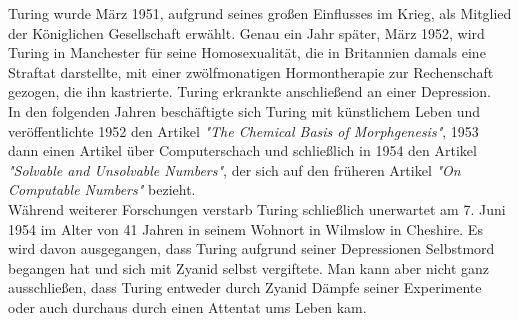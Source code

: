 Turing wurde März 1951, aufgrund seines großen Einflusses im Krieg, als Mitglied der Königlichen Gesellschaft erwählt.
Genau ein Jahr später, März 1952, wird Turing in Manchester für seine Homosexualität, die in Britannien damals eine Straftat darstellte, mit einer zwölfmonatigen Hormontherapie zur Rechenschaft gezogen, die ihn kastrierte. Turing erkrankte anschließend an einer Depression.\\
In den folgenden Jahren beschäftigte sich Turing mit künstlichem Leben und veröffentlichte 1952 den Artikel \textit{"The Chemical Basis of Morphgenesis"}, 1953 dann einen Artikel über Computerschach und schließlich in 1954 den Artikel \textit{"Solvable and Unsolvable Numbers"},  der sich auf den früheren Artikel \textit{"On Computable Numbers"} bezieht.\\
Während weiterer Forschungen verstarb Turing schließlich unerwartet am 7. Juni 1954 im Alter von 41 Jahren in seinem Wohnort in Wilmslow in Cheshire. Es wird davon ausgegangen, dass Turing aufgrund seiner Depressionen Selbstmord begangen hat und sich mit Zyanid selbst vergiftete. Man kann aber nicht ganz ausschließen, dass Turing entweder durch Zyanid Dämpfe seiner Experimente oder auch durchaus durch einen Attentat ums Leben kam.
